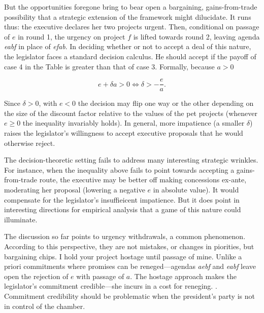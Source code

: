 \documentclass[letter,12pt]{article}
\begin{document}
But the opportunities foregone bring to bear open a bargaining, gains-from-trade possibility that a strategic extension of the framework might dilucidate. It runs thus: the executive declares her two projects urgent. Then, conditional on passage of $e$ in round 1, the urgency on project $f$ is lifted towards round 2, leaving agenda \emph{eabf} in place of \emph{efab}. In deciding whether or not to accept a deal of this nature, the legislator faces a standard decision calculus. He should accept if the payoff of case 4 in the Table is greater than that of case 3. Formally, because $a>0$

\begin{equation*}
e + \delta a >  0 \iff \delta  >   -\frac{e}{a}.
\end{equation*}

\noindent Since $\delta>0$, with $e<0$ the decision may flip one way or the other depending on the size of the discount factor relative to the values of the pet projects (whenever $e\geq0$ the inequality invariably holds). In general, more impatience (a smaller $\delta$) raises the legislator's willingness to accept executive proposals that he would otherwise reject.  

The decision-theoretic setting fails to address many interesting strategic wrinkles. For instance, when the inequality above fails to point towards accepting a gains-from-trade route, the executive may be better off making concessions ex-ante, moderating her proposal (lowering a negative $e$ in absolute value). It would compensate for the legislator's insuffieicent impatience. But it does point in interesting directions for empirical analysis that a game of this nature could illuminate. 

The discussion so far points to urgency withdrawals, a common phenomenon. According to this perspective, they are not mistakes, or changes in piorities, but bargaining chips. I hold your project hostage until passage of mine. Unlike a priori commitments where promises can be reneged---agendas \emph{aebf} and \emph{eabf} leave open the rejection of $e$ with passage of $a$. The hostage approach makes the legislator's commitment credible---she incurs in a cost for reneging. \citep[Although it is the president's word that is now questionable, she could call $f$ urgent after passage of $e$ to keep $a_0$ in place, cf.][]{weingast.1992}. Commitment credibility should be problematic when the president's party is not in control of the chamber. 
\end{document}
